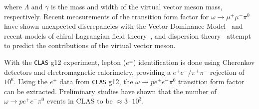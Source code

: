 \documentclass[epj]{webofc}
\begin{document}
 where $\Lambda$ and $\gamma$ is the mass and width of the virtual vector meson mass, respectively.
 Recent measurements of the transition form factor for $\omega \to \mu^+\mu^- \pi^0$ have shown unexpected discrepancies with the Vector Dominance Model~\cite{bib5} and recent models of chiral Lagrangian field theory~\cite{bib6}, and dispersion theory~\cite{Schneider} attempt to predict the contributions of the virtual vector meson.
 
With the \textsc{\texttt{CLAS}} g12 experiment, lepton ($e^{\pm}$) identification is done using Cherenkov detectors and electromagnetic calorimetry, providing a $e^{+}e^{-}/\pi^{+}\pi^{-}$ rejection of $10^6$. Using the $e^{\pm}$ data from \textsc{\texttt{CLAS}} g12, the $ \omega \to p e^+ e^- \pi^0$ transition form factor can be extracted. Preliminary studies have shown that the number of $ \omega \to p e^+ e^- \pi^0$ events in CLAS to be $\approx 3\cdot 10^3$.
\FloatBarrier
\end{document}
